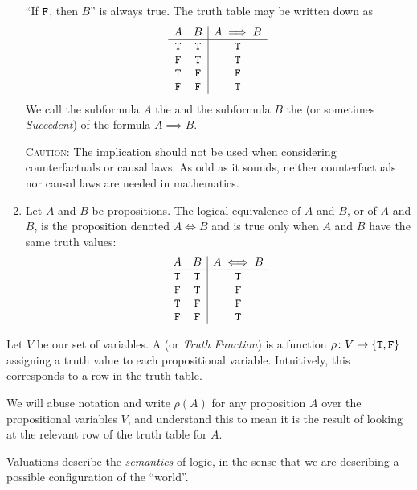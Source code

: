 \begin{node}[Semantics]
\begin{node}[Connectives]
\begin{enumerate}
  ``If $\mathtt{F}$, then $B$'' is always true. The truth table may be
  written down as
\[\begin{array}{cc|c}
A & B & A\implies B\\\hline
\mathtt{T}  & \mathtt{T}  & \mathtt{T}\\
\mathtt{F} & \mathtt{T}  & \mathtt{T}\\
\mathtt{T}  & \mathtt{F} & \mathtt{F}\\
\mathtt{F} & \mathtt{F} & \mathtt{T}\\
\end{array}\]
We call the subformula $A$ the  and the subformula
$B$ the  (or sometimes \textit{Succedent}) of the
formula $A\implies B$.

\textsc{Caution:} The implication should not be used when considering
counterfactuals or causal laws. As odd as it sounds, neither
counterfactuals nor causal laws are needed in mathematics.
\item Let $A$ and $B$ be propositions. The logical equivalence of $A$
  and $B$, or  of $A$ and $B$, is the proposition
  denoted $A\iff B$ and is true only when $A$ and $B$ have the same
  truth values:
\[\begin{array}{cc|c}
A & B & A\iff B\\\hline
\mathtt{T}  & \mathtt{T}  & \mathtt{T}\\
\mathtt{F} & \mathtt{T}  & \mathtt{F}\\
\mathtt{T}  & \mathtt{F} & \mathtt{F}\\
\mathtt{F} & \mathtt{F} & \mathtt{T}\\
\end{array}\]
\end{enumerate}
\end{node}

\begin{node}\label{prop-0004}%
Let $V$ be our set of variables. A  (or
\textit{Truth Function}) is a function $\rho\colon V\to\{\mathtt{T},\mathtt{F}\}$
assigning a truth value to each propositional variable. Intuitively,
this corresponds to a row in the truth table.

We will abuse notation and write $\rho(A)$ for any proposition $A$ over
the propositional variables $V$, and understand this to mean it is the
result of looking at the relevant row of the truth table for $A$.

Valuations describe the \emph{semantics} of logic, in the sense
that we are describing a possible configuration of the ``world''.
\end{node}


\end{node}
